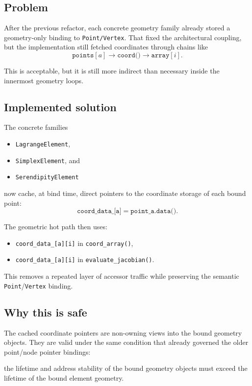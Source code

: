 \subsection{Problem}

After the previous refactor, each concrete geometry family already stored a
geometry-only binding to \texttt{Point/Vertex}.  That fixed the architectural
coupling, but the implementation still fetched coordinates through chains like
\[
  \texttt{points}[a] \rightarrow \texttt{coord()} \rightarrow \texttt{array}[i].
\]

This is acceptable, but it is still more indirect than necessary inside the
innermost geometry loops.

\subsection{Implemented solution}

The concrete families
\begin{itemize}[nosep]
  \item \texttt{LagrangeElement},
  \item \texttt{SimplexElement}, and
  \item \texttt{SerendipityElement}
\end{itemize}
now cache, at bind time, direct pointers to the coordinate storage of each
bound point:
\[
  \texttt{coord\_data\_[a]} = \texttt{point\_a.data()}.
\]

The geometric hot path then uses:
\begin{itemize}[nosep]
  \item \texttt{coord\_data\_[a][i]} in \texttt{coord\_array()},
  \item \texttt{coord\_data\_[a][i]} in \texttt{evaluate\_jacobian()}.
\end{itemize}

This removes a repeated layer of accessor traffic while preserving the semantic
\texttt{Point}/\texttt{Vertex} binding.

\subsection{Why this is safe}

The cached coordinate pointers are non-owning views into the bound geometry
objects.  They are valid under the same condition that already governed the
older point/node pointer bindings:
\begin{center}
the lifetime and address stability of the bound geometry objects must exceed the
lifetime of the bound element geometry.
\end{center}

